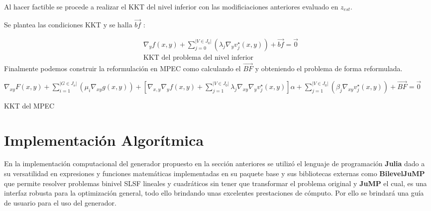 Al hacer factible se procede a realizar el KKT del nivel inferior con las modificiaciones anteriores evaluado en $z_{est}$.

Se plantea las condiciones KKT y se halla $\vec{bf}$ :

\begin{equation}
    \begin{aligned}
        &\nabla_{y}f(x,y)+\sum_{j=0}^{|V \in J_0|}(\lambda_j\nabla_{y}v_{j}^{\star}(x,y))+\vec{bf}=\vec{0}\\
        &\text{KKT del problema del nivel inferior}
    \end{aligned}
    \label{KKT_nivel_inferior}
\end{equation}
\linebreak
Finalmente podemos construir la reformulación en MPEC como  calculando el $\vec{BF}$ y 
obteniendo el problema de forma reformulada.
\begin{table}[H]
    \begin{equation}
        \label{KKT_del_MPEC}
    \end{equation}
	$\nabla_{xy}F(x,y)+\sum_{i=1}^{|G \in J_o|}(\mu_i\nabla_{xy}g(x,y))+[\nabla_{x,y}\nabla_{y}f(x,y)+\sum_{j=1}^{|V \in J_0|}\lambda_j\nabla_{xy}\nabla_{y}v_{j}^{\star}(x,y)]\alpha+\sum_{j=1}^{|V \in J_0|}(\beta_j\nabla_{xy}v_{j}^{\star}(x,y))+\vec{BF}=\vec{0}$  \label{KKT_del_MPEC}
\caption*{KKT del MPEC}
\end{table}


\section{Implementación Algorítmica}

En la implementación computacional del generador propuesto en la sección anteriores
se utilizó el lenguaje de programación \textbf{Julia} \cite{Juliadocs} dado a su versatilidad
en expresiones y funciones matemáticas implementadas en su paquete base y sus bibliotecas externas como 
\textbf{BilevelJuMP} \cite{BilevelJump} que permite resolver problemas binivel SLSF lineales y cuadráticos
sin tener que transformar el problema original y \textbf{JuMP} \cite{JuMPPaper} el cual, es una interfaz robusta para la optimización general,
todo ello brindando unas excelentes prestaciones de cómputo. Por ello se brindará una guía de usuario para el uso del generador.

